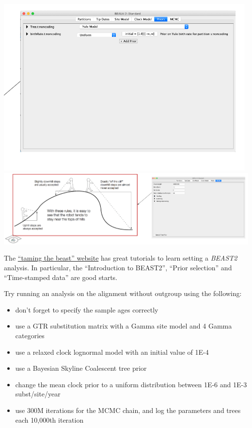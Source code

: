 \documentclass[
  letterpaper,
]{book}
\providecommand{\tightlist}{%
  \setlength{\itemsep}{0pt}\setlength{\parskip}{0pt}}\usepackage{longtable,booktabs,array}
\begin{document}
\includegraphics{assets/images/chapters/phylogenomics/30.png}
\includegraphics{assets/images/chapters/phylogenomics/31.png}

The \href{https://taming-the-beast.org/tutorials/}{``taming the beast''
website} has great tutorials to learn setting a \emph{BEAST2} analysis.
In particular, the ``Introduction to BEAST2'', ``Prior selection'' and
``Time-stamped data'' are good starts.

Try running an analysis on the alignment without outgroup using the
following:

\begin{itemize}
\tightlist
\item
  don't forget to specify the sample ages correctly
\item
  use a GTR substitution matrix with a Gamma site model and 4 Gamma
  categories
\item
  use a relaxed clock lognormal model with an initial value of 1E-4
\item
  use a Bayesian Skyline Coalescent tree prior
\item
  change the mean clock prior to a uniform distribution between 1E-6 and
  1E-3 subst/site/year
\item
  use 300M iterations for the MCMC chain, and log the parameters and
  trees each 10,000th iteration
\end{itemize}
\end{document}
